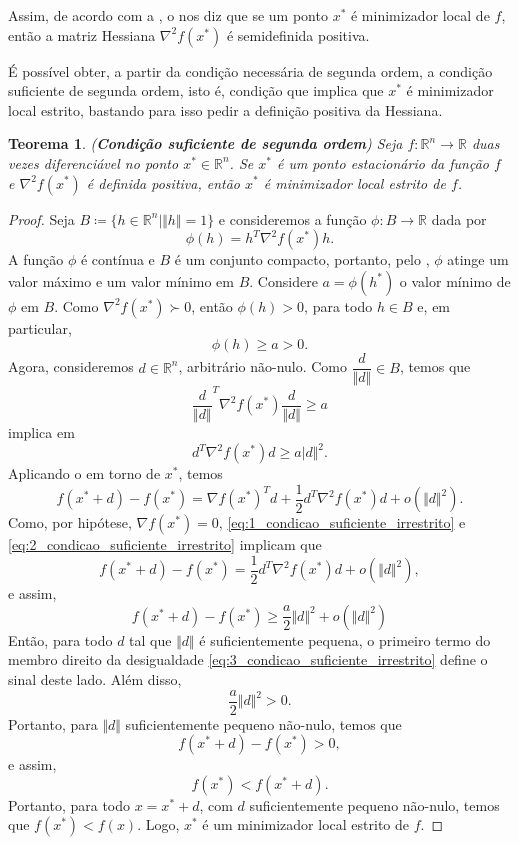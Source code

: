 \documentclass[12pt,a4paper]{scrartcl}
\def\RR{\mathds{R}}
\newtheorem{teo}{Teorema}
\theoremstyle{definition}%
\begin{document}
Assim, de acordo com a , o  nos diz que se um ponto $x^{*}$ é minimizador local de $f$, então a matriz Hessiana $\nabla^{2} f(x^{*})$ é semidefinida positiva.

É possível obter, a partir da condição necessária de segunda ordem, a condição suficiente de segunda ordem, isto é, condição que implica que $x^{*}$ é minimizador local estrito, bastando para isso pedir a definição positiva da Hessiana.

\begin{teo}(\textbf{Condição suficiente de segunda ordem}) \label{teo:condicao_suficiente_irrestrito}
Seja $f:\RR^{n} \rightarrow \RR$ duas vezes diferenciável no ponto $x^{*} \in \RR^{n}$. Se $x^{*}$ é um ponto estacionário da função $f$ e $\nabla^{2} f(x^{*})$ é definida positiva, então $x^{*}$ é minimizador local estrito de $f$.
\end{teo}
\begin{proof}
Seja $B \coloneqq \{ h\in \RR^{n} \mid \Vert h \Vert =1 \}$ e consideremos a função $\phi : B \rightarrow \RR$ dada por
\[
\phi (h) = h^{T} \nabla^{2} f(x^{*})h.
\]
A função $\phi$ é contínua e $B$ é um conjunto compacto, portanto, pelo , $\phi$ atinge um valor máximo e um valor mínimo em $B$. Considere $a = \phi(h^{*})$ o valor mínimo de $\phi$ em $B$. Como $\nabla^{2} f(x^{*}) \succ 0$, então $\phi(h) >0$, para todo $h\in B$ e, em particular,
\[
\phi(h) \geq a >0.
\]
Agora, consideremos $d\in \RR^{n}$, arbitrário não-nulo. Como $\dfrac{d}{\Vert d \Vert} \in B$, temos que
\[
{\dfrac{d}{\Vert d \Vert}}^{T} \nabla^{2} f(x^{*})\dfrac{d}{\Vert d \Vert} \geq a
\]
implica em
\[ \label{eq:1_condicao_suficiente_irrestrito}
d^{T}\nabla^{2} f(x^{*})d \geq a\vert d\Vert^{2} .
\]
Aplicando o  em torno de $x^{*}$, temos
\[\label{eq:2_condicao_suficiente_irrestrito}
f(x^{*}+d) - f(x^{*}) = \nabla f(x^{*})^{T}d + \dfrac{1}{2} d^{T}\nabla^{2} f(x^{*})d + o(\Vert d \Vert^{2}).
\]
Como, por hipótese, $\nabla f(x^{*}) = 0$, \eqref{eq:1_condicao_suficiente_irrestrito} e \eqref{eq:2_condicao_suficiente_irrestrito} implicam que
\[ 
f(x^{*}+d) - f(x^{*}) = \dfrac{1}{2} d^{T}\nabla^{2} f(x^{*})d + o(\Vert d \Vert^{2}) ,
\]
e assim, 
\[ \label{eq:3_condicao_suficiente_irrestrito}
f(x^{*}+d) - f(x^{*}) \geq \dfrac{a}{2}\Vert d \Vert^{2} + o(\Vert d \Vert^{2})
\]
Então, para todo $d$ tal que $\Vert d \Vert$ é suficientemente pequena, o primeiro termo do membro direito da desigualdade \eqref{eq:3_condicao_suficiente_irrestrito} define o sinal deste lado. Além disso,
\[
\dfrac{a}{2}\Vert d \Vert^{2} >0.
\]
Portanto, para $\Vert d \Vert$ suficientemente pequeno não-nulo, temos que 
\[
f(x^{*} + d) - f(x^{*}) >0,
\]
e assim,
\[
f(x^{*}) < f(x^{*} + d).
\]
Portanto, para todo $x = x^{*} + d$, com $d$ suficientemente pequeno não-nulo, temos que $f(x^{*}) < f(x)$. Logo, $x^{*}$ é um minimizador local estrito de $f$.
\end{proof}
\end{document}
